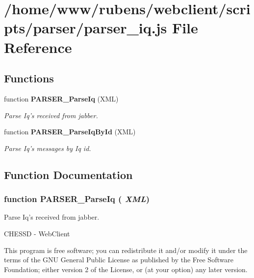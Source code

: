 \section{/home/www/rubens/webclient/scripts/parser/parser\_\-iq.js File Reference}
\label{parser__iq_8js}
\subsection*{Functions}
\begin{CompactItemize}
\item 
function {\bf PARSER\_\-ParseIq} (XML)
\begin{CompactList}\small\item\em Parse Iq's received from jabber. \item\end{CompactList}\item 
function {\bf PARSER\_\-ParseIqById} (XML)
\begin{CompactList}\small\item\em Parse Iq's messages by Iq id. \item\end{CompactList}\end{CompactItemize}


\subsection{Function Documentation}
\subsubsection[PARSER\_\-ParseIq]{\setlength{\rightskip}{0pt plus 5cm}function PARSER\_\-ParseIq ( {\em XML})}\label{parser__iq_8js_3a156ad4fae8f7ebe3f282b4c8d2ba01}


Parse Iq's received from jabber. 

CHESSD - WebClient

This program is free software; you can redistribute it and/or modify it under the terms of the GNU General Public License as published by the Free Software Foundation; either version 2 of the License, or (at your option) any later version.

